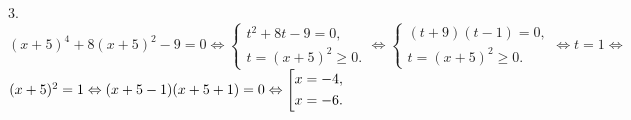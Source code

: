 3. $(x+5)^4+8(x+5)^2-9=0\Leftrightarrow \begin{cases}
t^2+8t-9=0,\\
t=(x+5)^2\geqslant0.\end{cases}\Leftrightarrow \begin{cases}
(t+9)(t-1)=0,\\
t=(x+5)^2\geqslant0.\end{cases}\Leftrightarrow t=1 \Leftrightarrow$\\$
(x+5)^2=1 \Leftrightarrow (x+5-1)(x+5+1)=0 \Leftrightarrow
\left[
\begin{gathered}
x=-4, \hfill
\\
x=-6. \hfill
\\
\end{gathered}
\right.\hfill$\\
